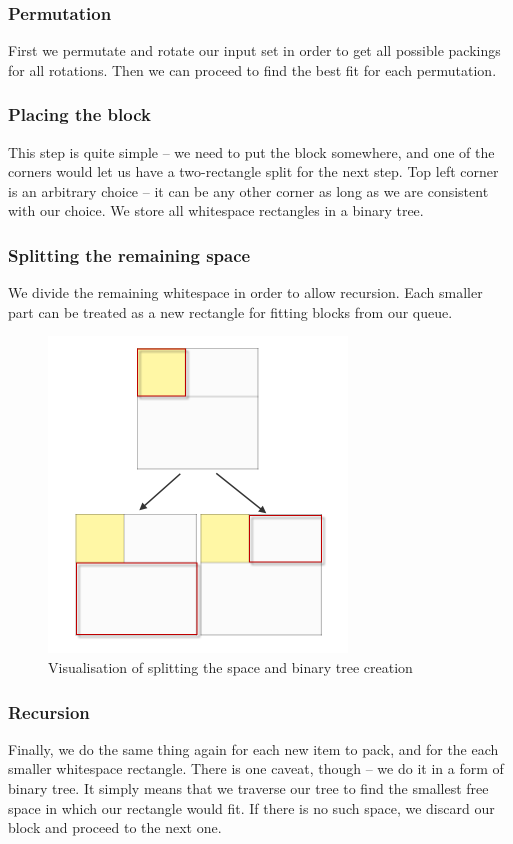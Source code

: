 \subsubsection{Permutation}
First we permutate and rotate our input set in order to get
all possible packings for all rotations.
Then we can proceed to find the best fit for each permutation.

\subsubsection{Placing the block}
This step is quite simple -- we need to put the block somewhere,
and one of the corners would let us have a two-rectangle split for the next step.
Top left corner is an arbitrary choice -- it can be any other corner as long
as we are consistent with our choice.
We store all whitespace rectangles in a binary tree.

\subsubsection{Splitting the remaining space}
We divide the remaining whitespace in order to allow recursion.
Each smaller part can be treated as a new rectangle
for fitting blocks from our queue.
\begin{figure}[H]
  \centering
	\includegraphics[width=.5\textwidth]{split}
  \caption{Visualisation of splitting the space and binary tree creation}
  \label{fig:split}
\end{figure}

\subsubsection{Recursion}
Finally, we do the same thing again for each new item to pack,
and for the each smaller whitespace rectangle.
There is one caveat, though -- we do it in a form of binary tree.
It simply means that we traverse our tree to find the smallest free space
in which our rectangle would fit.
If there is no such space, we discard our block and proceed to the next one.

